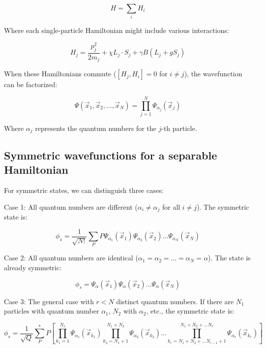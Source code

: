 \documentclass[italian]{HKNdocument}
\begin{document}
\begin{equation}
H=\sum_i H_i
\end{equation}

Where each single-particle Hamiltonian might include various interactions:

\begin{equation}
H_j=\frac{p_j^2}{2m_j}+\chi L_j\cdot S_j+\gamma B(L_j+gS_j)
\end{equation}

When these Hamiltonians commute ($[H_j,H_i]=0$ for $i\neq j$), the wavefunction can be factorized:

\begin{equation}
\Psi(\vec{x}_1,\vec{x}_2,\ldots,\vec{x}_N)=\prod_{j=1}^{N}\Psi_{\alpha_j}(\vec{x}_j)
\end{equation}

Where $\alpha_j$ represents the quantum numbers for the $j$-th particle.

\subsection{Symmetric wavefunctions for a separable Hamiltonian}
For symmetric states, we can distinguish three cases:

Case 1: All quantum numbers are different ($\alpha_i\neq\alpha_j$ for all $i\neq j$). The symmetric state is:

\begin{equation}
\phi_s=\frac{1}{\sqrt{N!}}\sum_P P\Psi_{\alpha_1}(\vec{x}_1)\Psi_{\alpha_2}(\vec{x}_2)\ldots\Psi_{\alpha_N}(\vec{x}_N)
\end{equation}

Case 2: All quantum numbers are identical ($\alpha_1=\alpha_2=\ldots=\alpha_N=\alpha$). The state is already symmetric:

\begin{equation}
\phi_s=\Psi_{\alpha}(\vec{x}_1)\Psi_{\alpha}(\vec{x}_2)\ldots\Psi_{\alpha}(\vec{x}_N)
\end{equation}

Case 3: The general case with $r<N$ distinct quantum numbers. If there are $N_1$ particles with quantum number $\alpha_1$, $N_2$ with $\alpha_2$, etc., the symmetric state is:

\begin{equation}
\phi_s=\frac{1}{\sqrt{Q}}\sum_P^* P\left[\prod_{k_1=1}^{N_1}\Psi_{\alpha_1}(\vec{x}_{k_1})\prod_{k_2=N_1+1}^{N_1+N_2}\Psi_{\alpha_2}(\vec{x}_{k_2})\ldots\prod_{k_r=N_1+N_2+\ldots N_{r-1}+1}^{N_1+N_2+\ldots N_r}\Psi_{\alpha_r}(\vec{x}_{k_r})\right]
\end{equation}
\end{document}
